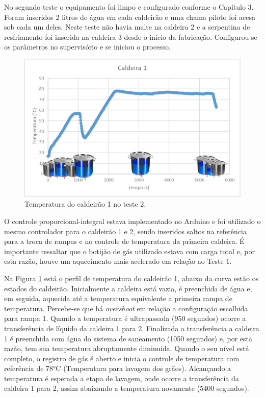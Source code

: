 No segundo teste o equipamento foi limpo e configurado conforme o Capítulo 3. Foram inseridos 2 litros de água em cada caldeirão e uma chama piloto foi acesa sob cada um deles. Neste teste não havia malte na caldeira 2 e a serpentina de resfriamento foi inserida na caldeira 3 desde o início da fabricação. Configurou-se os parâmetros no supervisório e se iniciou o processo. 
  \begin{figure}[htb]
	\caption{\label{teste02c1}Temperatura do caldeirão 1 no teste 2.}
	\begin{center}
	    \includegraphics[width=0.95\linewidth]{./img/teste02_cald1.jpg}
	\end{center}
\end{figure}
O controle proporcional-integral estava implementado no Arduino e foi utilizado o mesmo controlador para o caldeirão 1 e 2, sendo inseridos saltos na referência para a troca de rampas e no controle de temperatura da primeira caldeira. É importante ressaltar que o botijão de gás utilizado estava com carga total e, por esta razão, houve um aquecimento mais acelerado em relação ao Teste 1.

Na Figura \ref{teste02c1} está o perfil de temperatura do caldeirão 1, abaixo da curva estão os estados do caldeirão. Inicialmente a caldeira está vazia, é preenchida de água e, em seguida, aquecida até a temperatura equivalente a primeira rampa de temperatura. Percebe-se que há \textit{overshoot} em relação a configuração escolhida para rampa 1. Quando a temperatura é ultrapassada (950 segundos) ocorre a transferência de líquido da caldeira 1 para 2. Finalizada a transferência a caldeira 1 é preenchida com água do sistema de saneamento (1050 segundos) e, por esta razão, tem sua temperatura abruptamente diminuída. Quando o seu nível está completo, o registro de gás é aberto e inicia o controle de temperatura com referência de 78°C (Temperatura para lavagem dos grãos). Alcançando a temperatura é esperada a etapa de lavagem, onde ocorre a transferência da caldeira 1 para 2, assim abaixando a temperatura novamente (5400 segundos).


